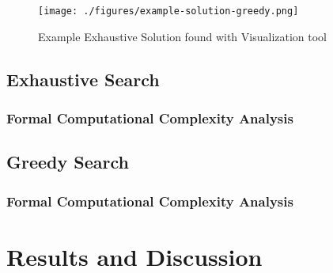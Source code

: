\documentclass[...]{revdetua}
\begin{document}
\begin{figure}[!htb]
    \centering
    \texttt{[image: ./figures/example-solution-greedy.png]}
    \caption{Example Exhaustive Solution found with Visualization tool}
    \label{fig: Example Solution}
\end{figure}



\subsection{Exhaustive Search}

\subsubsection{Formal Computational Complexity Analysis}


\subsection{Greedy Search}

\subsubsection{Formal Computational Complexity Analysis}



\section{Results and Discussion}


\begin{table}[!htb]
\caption{\label{tab:table-name}Obtained results for the Exhaustive Approach}
\end{table}
 
\end{document}
